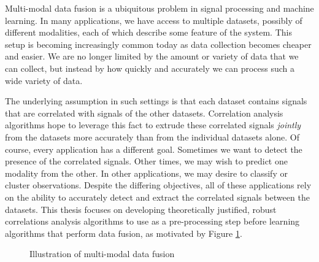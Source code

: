 Multi-modal data fusion is a ubiquitous problem in signal processing and machine
learning. In many applications, we have access to multiple datasets, possibly of different
modalities, each of which describe some feature of the system. This setup is becoming
increasingly common today as data collection becomes cheaper and easier. We are no longer
limited by the amount or variety of data that we can collect, but instead by how quickly
and accurately we can process such a wide variety of data.

The underlying assumption in such settings is that each dataset contains signals that are
correlated with signals of the other datasets. Correlation analysis algorithms hope to
leverage this fact to extrude these correlated signals \textit{jointly} from the datasets
more accurately than from the individual datasets alone. Of course, every application has
a different goal. Sometimes we want to detect the presence of the correlated
signals. Other times, we may wish to predict one modality from the other. In other
applications, we may desire to classify or cluster observations. Despite the differing
objectives, all of these applications rely on the ability to accurately detect and extract
the correlated signals between the datasets. This thesis focuses on developing
theoretically justified, robust correlations analysis algorithms to use as a
pre-processing step before learning algorithms that perform data fusion, as
motivated by Figure \ref{fig:data_fusion}.

\begin{figure}
\begin{center}  
    \caption{Illustration of multi-modal data fusion}
    \label{fig:data_fusion}
\end{center}
\end{figure}


